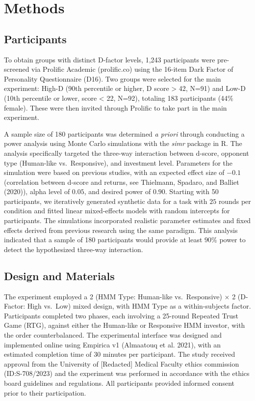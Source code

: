 \documentclass[
]{article}
\begin{document}
\section{Methods}\label{methods}

\subsection{Participants}\label{participants}

To obtain groups with distinct D-factor levels, 1,243 participants were pre-screened via Prolific Academic (prolific.co) using the 16-item Dark Factor of Personality Questionnaire (D16). Two groups were selected for the main experiment: High-D (90th percentile or higher, D score \textgreater{} 42, N=91) and Low-D (10th percentile or lower, score \textless{} 22, N=92), totaling 183 participants (44\% female). These were then invited through Prolific to take part in the main experiment.

A sample size of 180 participants was determined \emph{a priori} through conducting a power analysis using Monte Carlo simulations with the \emph{simr} package in R. The analysis specifically targeted the three-way interaction between d-score, opponent type (Human-like vs.~Responsive), and investment level. Parameters for the simulation were based on previous studies, with an expected effect size of \(-0.1\) (correlation between d-score and returns, see Thielmann, Spadaro, and Balliet (2020)), alpha level of \(0.05\), and desired power of \(0.90\). Starting with 50 participants, we iteratively generated synthetic data for a task with \(25\) rounds per condition and fitted linear mixed-effects models with random intercepts for participants. The simulations incorporated realistic parameter estimates and fixed effects derived from previous research using the same paradigm. This analysis indicated that a sample of 180 participants would provide at least \(90\%\) power to detect the hypothesized three-way interaction.

\subsection{Design and Materials}\label{design-and-materials}

The experiment employed a 2 (HMM Type: Human-like vs.~Responsive) × 2 (D-Factor: High vs.~Low) mixed design, with HMM Type as a within-subjects factor. Participants completed two phases, each involving a 25-round Repeated Trust Game (RTG), against either the Human-like or Responsive HMM investor, with the order counterbalanced.
The experimental interface was designed and implemented online using Empirica v1 (Almaatouq et al. 2021), with an estimated completion time of 30 minutes per participant. The study received approval from the University of {[}Redacted{]} Medical Faculty ethics commission (ID:S-708/2023) and the experiment was performed in accordance with the ethics board guidelines and regulations. All participants provided informed consent prior to their participation.
\end{document}
